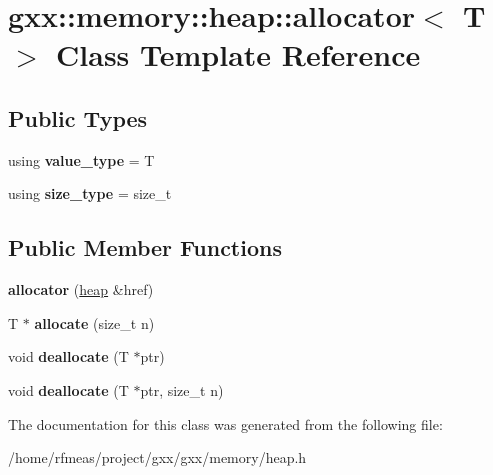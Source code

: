 \hypertarget{classgxx_1_1memory_1_1heap_1_1allocator}{}\section{gxx\+:\+:memory\+:\+:heap\+:\+:allocator$<$ T $>$ Class Template Reference}
\label{classgxx_1_1memory_1_1heap_1_1allocator}
\subsection*{Public Types}
\begin{DoxyCompactItemize}
\item 
using {\bfseries value\+\_\+type} = T\hypertarget{classgxx_1_1memory_1_1heap_1_1allocator_a3c437d3eddd7c9f19655044c9bb41eb3}{}\label{classgxx_1_1memory_1_1heap_1_1allocator_a3c437d3eddd7c9f19655044c9bb41eb3}

\item 
using {\bfseries size\+\_\+type} = size\+\_\+t\hypertarget{classgxx_1_1memory_1_1heap_1_1allocator_a62af5de9efe92cc0782ca100e7bb1b80}{}\label{classgxx_1_1memory_1_1heap_1_1allocator_a62af5de9efe92cc0782ca100e7bb1b80}

\end{DoxyCompactItemize}
\subsection*{Public Member Functions}
\begin{DoxyCompactItemize}
\item 
{\bfseries allocator} (\hyperlink{classgxx_1_1memory_1_1heap}{heap} \&href)\hypertarget{classgxx_1_1memory_1_1heap_1_1allocator_a0477bfa3696987d7723ee2497d91a19d}{}\label{classgxx_1_1memory_1_1heap_1_1allocator_a0477bfa3696987d7723ee2497d91a19d}

\item 
T $\ast$ {\bfseries allocate} (size\+\_\+t n)\hypertarget{classgxx_1_1memory_1_1heap_1_1allocator_a1c2358d98178b5a2da0867d8290ea60b}{}\label{classgxx_1_1memory_1_1heap_1_1allocator_a1c2358d98178b5a2da0867d8290ea60b}

\item 
void {\bfseries deallocate} (T $\ast$ptr)\hypertarget{classgxx_1_1memory_1_1heap_1_1allocator_a0972ffae5174701244727be2ac5af8ce}{}\label{classgxx_1_1memory_1_1heap_1_1allocator_a0972ffae5174701244727be2ac5af8ce}

\item 
void {\bfseries deallocate} (T $\ast$ptr, size\+\_\+t n)\hypertarget{classgxx_1_1memory_1_1heap_1_1allocator_a0bea700f70c671ae4d1526a3e3d2cdaf}{}\label{classgxx_1_1memory_1_1heap_1_1allocator_a0bea700f70c671ae4d1526a3e3d2cdaf}

\end{DoxyCompactItemize}


The documentation for this class was generated from the following file\+:\begin{DoxyCompactItemize}
\item 
/home/rfmeas/project/gxx/gxx/memory/heap.\+h\end{DoxyCompactItemize}
